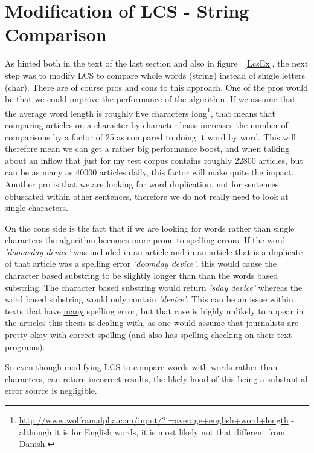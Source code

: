 \section{Modification of LCS - String Comparison}
As hinted both in the text of the last section and also in figure ~\ref{LcsEx}, the next step was to modify LCS to compare whole words (string) instead of single letters (char). There are of course pros and cons to this approach. One of the pros would be that we could improve the performance of the algorithm. If we assume that the average word length is roughly five characters long\footnote{\url{http://www.wolframalpha.com/input/?i=average+english+word+length} - although it is for English words, it is most likely not that different from Danish.}, that means that comparing articles on a character by character basis increases the number of comparisons by a factor of 25 as compared to doing it word by word. This will therefore mean we can get a rather big performance boost, and when talking about an inflow that just for my test corpus contains roughly 22800 articles, but can be as many as 40000 articles daily, this factor will make quite the impact. Another pro is that we are looking for word duplication, not for sentences obfuscated within other sentences, therefore we do not really need to look at single characters.

On the cons side is the fact that if we are looking for words rather than single characters the algorithm becomes more prone to spelling errors. If the word \textit{'doomsday device'} was included in an article and in an article that is a duplicate of that article was a spelling error \textit{'doomday device'}, this would cause the character based substring to be slightly longer than than the words based substring. The character based substring would return \textit{'sday device'} whereas the word based substring would only contain \textit{'device'}. This can be an issue within texts that have \underline{many} spelling error, but that case is highly unlikely to appear in the articles this thesis is dealing with, as one would assume that journalists are pretty okay with correct spelling (and also has spelling checking on their text programs). 

So even though modifying LCS to compare words with words rather than characters, can return incorrect results, the likely hood of this being a substantial error source is negligible.

